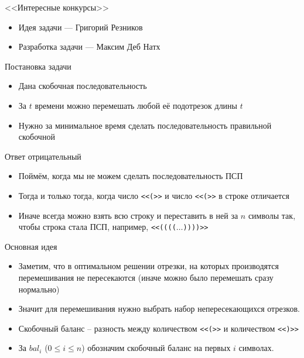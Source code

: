 \begin{frame}
  \begin{center}
    \LARGE <<Интересные конкурсы>>
  \end{center}

  \begin{itemize}
  \item Идея задачи --- Григорий Резников
  \item Разработка задачи --- Максим Деб Натх
  \end{itemize}

\end{frame}

\begin{frame}{Постановка задачи}

  \begin{itemize}
  \item Дана скобочная последовательность
  \item За $t$ времени можно перемешать любой её подотрезок длины $t$
  \item Нужно за минимальное время сделать последовательность правильной скобочной
  \end{itemize}
  
\end{frame}

\begin{frame}{Ответ отрицательный}
  \begin{itemize}
  \item Поймём, когда мы не можем сделать последовательность ПСП
  \item Тогда и только тогда, когда число \texttt{<<(>>} и число \texttt{<<(>>} в строке отличается
  \item Иначе всегда можно взять всю строку и переставить в ней за $n$ символы так, чтобы строка стала ПСП, например, \texttt{<<(((($\dots$))))>>}
  \end{itemize}
\end{frame}

\begin{frame}{Основная идея}
  \begin{itemize}
  \item Заметим, что в оптимальном решении отрезки, на которых производятся перемешивания не пересекаются (иначе можно было перемешать сразу нормально)
  \item Значит для перемешивания нужно выбрать набор непересекающихся отрезков.
    \bigskip
  \item Скобочный баланс -- разность между количеством \texttt{<<(>>} и количеством \texttt{<<)>>}
  \item За $bal_i$ ($0 \le i \le n$) обозначим скобочный баланс на первых $i$ символах.
  \end{itemize}
\end{frame}

